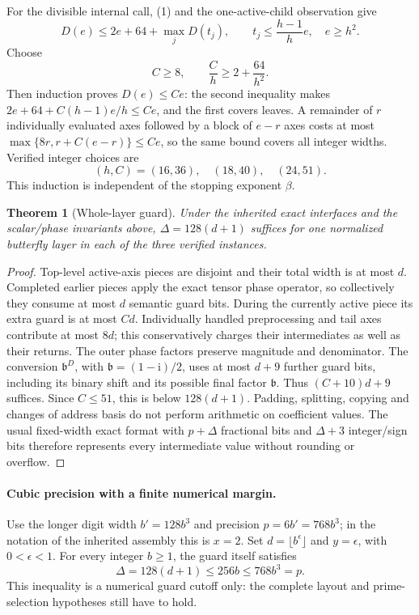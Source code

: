 \documentclass[11pt]{article}
\newtheorem{theorem}{Theorem}
\newcommand{\ii}{\mathrm i}
\begin{document}
For the divisible internal call, (1) and the one-active-child observation give
\[
 D(e)\le 2e+64+\max_j D(t_j),\qquad
 t_j\le\frac{h-1}{h}e,\quad e\ge h^2.
\]
Choose
\[
 C\ge8,\qquad \frac{C}{h}\ge 2+\frac{64}{h^2}.
\]
Then induction proves $D(e)\le Ce$: the second inequality makes
$2e+64+C(h-1)e/h\le Ce$, and the first covers leaves. A remainder of
$r$ individually evaluated axes followed by a block of $e-r$ axes
costs at most $\max\{8r,r+C(e-r)\}\le Ce$, so the same bound covers
all integer widths. Verified integer choices are
\[
       (h,C)=(16,36),\quad(18,40),\quad(24,51).
\]
This induction is independent of the stopping exponent $\beta$.

\begin{theorem}[Whole-layer guard]
Under the inherited exact interfaces and the scalar/phase invariants above,
$\Delta=128(d+1)$ suffices for one normalized butterfly layer in each
of the three verified instances.
\end{theorem}
\begin{proof}
Top-level active-axis pieces are disjoint and their total width is at most
$d$. Completed earlier pieces apply the exact tensor phase operator, so
collectively they consume at most $d$ semantic guard bits.
During the currently active piece its extra guard is at most $Cd$.
Individually handled preprocessing and tail axes contribute at most $8d$;
this conservatively charges their intermediates as well as their returns.
The outer phase factors preserve magnitude and denominator. The conversion
$\mathfrak b^D$, with $\mathfrak b=(1-\ii)/2$, uses at most $d+9$ further guard bits,
including its binary shift and its possible final factor $\mathfrak b$.
Thus $(C+10)d+9$ suffices. Since $C\le51$, this is below $128(d+1)$.
Padding, splitting, copying and changes of address basis do not perform
arithmetic on coefficient values. The usual fixed-width exact format with
$p+\Delta$ fractional bits and $\Delta+3$ integer/sign bits therefore
represents every intermediate value without rounding or overflow.
\end{proof}

\paragraph{Cubic precision with a finite numerical margin.}
Use the longer digit width $b'=128b^3$ and precision $p=6b'=768b^3$;
in the notation of the inherited assembly this is $x=2$.
Set $d=\lfloor b^\epsilon\rfloor$ and $y=\epsilon$, with $0<\epsilon<1$.
For every integer $b\ge1$, the guard itself satisfies
\[
 \Delta=128(d+1)\le256b\le768b^3=p.
\]
This inequality is a numerical guard cutoff only: the complete layout and
prime-selection hypotheses still have to hold.
\end{document}
